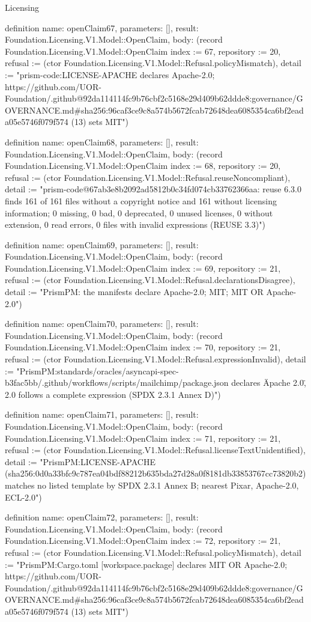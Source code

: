 \begin{lexlean}{Licensing}
\begin{semanticmodule}
definition{
  name: openClaim67,
  parameters: [],
  result: Foundation.Licensing.V1.Model::OpenClaim,
  body: (record Foundation.Licensing.V1.Model::OpenClaim {index := 67, repository := 20, refusal := (ctor Foundation.Licensing.V1.Model::Refusal.policyMismatch), detail := "prism-code:LICENSE-APACHE declares Apache-2.0; https://github.com/UOR-Foundation/.github@92da114114fc9b76cbf2c5168e29d409b62ddde8:governance/GOVERNANCE.md#sha256:96caf3ce9c8a574b5672fcab72648dea6085354ca6bf2eada05e5746f079f574 (13) sets MIT"})
}

definition{
  name: openClaim68,
  parameters: [],
  result: Foundation.Licensing.V1.Model::OpenClaim,
  body: (record Foundation.Licensing.V1.Model::OpenClaim {index := 68, repository := 20, refusal := (ctor Foundation.Licensing.V1.Model::Refusal.reuseNoncompliant), detail := "prism-code@67ab3e8b2092ad5812b0c34fd074cb33762366aa: reuse 6.3.0 finds 161 of 161 files without a copyright notice and 161 without licensing information; 0 missing, 0 bad, 0 deprecated, 0 unused licenses, 0 without extension, 0 read errors, 0 files with invalid expressions (REUSE 3.3)"})
}

definition{
  name: openClaim69,
  parameters: [],
  result: Foundation.Licensing.V1.Model::OpenClaim,
  body: (record Foundation.Licensing.V1.Model::OpenClaim {index := 69, repository := 21, refusal := (ctor Foundation.Licensing.V1.Model::Refusal.declarationsDisagree), detail := "PrismPM: the manifests declare Apache-2.0; MIT; MIT OR Apache-2.0"})
}

definition{
  name: openClaim70,
  parameters: [],
  result: Foundation.Licensing.V1.Model::OpenClaim,
  body: (record Foundation.Licensing.V1.Model::OpenClaim {index := 70, repository := 21, refusal := (ctor Foundation.Licensing.V1.Model::Refusal.expressionInvalid), detail := "PrismPM:standards/oracles/asyncapi-spec-b3fac5bb/.github/workflows/scripts/mailchimp/package.json declares \"Apache 2.0\", 2.0 follows a complete expression (SPDX 2.3.1 Annex D)"})
}

definition{
  name: openClaim71,
  parameters: [],
  result: Foundation.Licensing.V1.Model::OpenClaim,
  body: (record Foundation.Licensing.V1.Model::OpenClaim {index := 71, repository := 21, refusal := (ctor Foundation.Licensing.V1.Model::Refusal.licenseTextUnidentified), detail := "PrismPM:LICENSE-APACHE (sha256:0d0a33bfc9c787ea04bdf88212b635bda27d28a0f8181db33853767cc73820b2) matches no listed template by SPDX 2.3.1 Annex B; nearest Pixar, Apache-2.0, ECL-2.0"})
}

definition{
  name: openClaim72,
  parameters: [],
  result: Foundation.Licensing.V1.Model::OpenClaim,
  body: (record Foundation.Licensing.V1.Model::OpenClaim {index := 72, repository := 21, refusal := (ctor Foundation.Licensing.V1.Model::Refusal.policyMismatch), detail := "PrismPM:Cargo.toml [workspace.package] declares MIT OR Apache-2.0; https://github.com/UOR-Foundation/.github@92da114114fc9b76cbf2c5168e29d409b62ddde8:governance/GOVERNANCE.md#sha256:96caf3ce9c8a574b5672fcab72648dea6085354ca6bf2eada05e5746f079f574 (13) sets MIT"})
}


\end{semanticmodule}
\end{lexlean}
